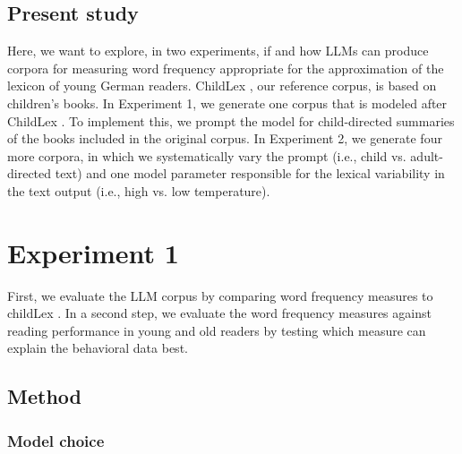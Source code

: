 \documentclass[doc, a4paper]{apa7}
\begin{document}
\subsection*{Present study}

Here, we want to explore, in two experiments, if and how LLMs can produce corpora for measuring word frequency appropriate for the approximation of the lexicon of young German readers. ChildLex \cite{schroeder_childlex_2015}, our reference corpus, is based on children's books. In Experiment 1, we generate one corpus that is modeled after ChildLex \cite{schroeder_childlex_2015}. To implement this, we prompt the model for child-directed summaries of the books included in the original corpus. In Experiment 2, we generate four more corpora, in which we systematically vary the prompt (i.e., child vs. adult-directed text) and one model parameter responsible for the lexical variability in the text output (i.e., high vs. low temperature).

\section{Experiment 1}



First, we evaluate the LLM corpus by comparing word frequency measures to childLex \cite{schroeder_childlex_2015}. In a second step, we evaluate the word frequency measures against reading performance \cite{schroter_developmental_2017} in young and old readers by testing which measure can explain the behavioral data best. 

\subsection{Method}

\subsubsection*{Model choice}
\end{document}
